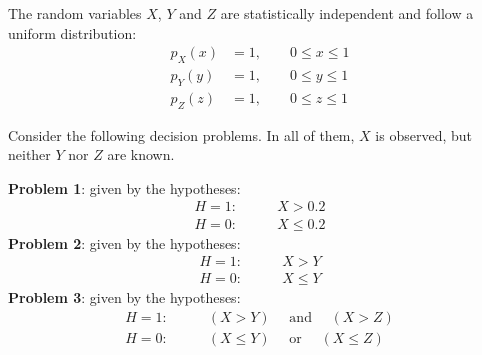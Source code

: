 \else 

\question 

The random variables $X$, $Y$ and $Z$ are statistically independent and follow a uniform distribution:
\begin{align*}
p_X(x) &= 1,    \qquad 0 \le x \le 1  \\
p_Y(y) &= 1,    \qquad 0 \le y \le 1  \\
p_Z(z) &= 1,    \qquad 0 \le z \le 1
\end{align*}

Consider the following decision problems. In all of them, $X$ is observed, but neither $Y$ nor $Z$ are known.

\textbf{Problem 1}: given by the hypotheses:
\begin{align*}
H=1: & \qquad  X > 0.2   \\
H=0: & \qquad  X \le 0.2
\end{align*}
\textbf{Problem 2}: given by the hypotheses:
\begin{align*}
H=1: & \qquad  X > Y   \\
H=0: & \qquad  X \le Y
\end{align*}
\textbf{Problem 3}: given by the hypotheses:
\begin{align*}
H=1: & \qquad (X > Y)   \quad \text{ and }\quad (X > Z) \\
H=0: & \qquad (X \le Y) \quad \text{ or }\quad (X \le Z)
\end{align*}



